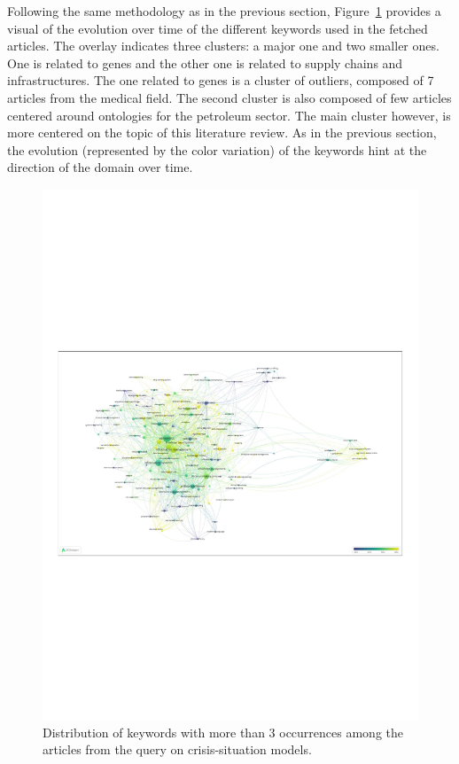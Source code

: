Following the same methodology as in the previous section, Figure~\ref{literature:situation-models-overlay} provides a visual of the evolution over time of the different keywords used in the fetched articles.
The overlay indicates three clusters: a major one and two smaller ones.
One is related to genes and the other one is related to supply chains and infrastructures.
The one related to genes is a cluster of outliers, composed of 7 articles from the medical field.
The second cluster is also composed of few articles centered around ontologies for the petroleum sector.
The main cluster however, is more centered on the topic of this literature review.
As in the previous section, the evolution (represented by the color variation) of the keywords hint at the direction of the domain over time.

\begin{landscape}
    \begin{figure}[htb]
        \includegraphics[width=\paperwidth,height=\paperheight,keepaspectratio]{figures/chap-2/situation-models-overlay.pdf}
        \caption{Distribution of keywords with more than 3 occurrences among the articles from the query on crisis-situation models.}
        \label{literature:situation-models-overlay}
    \end{figure}
\end{landscape}

